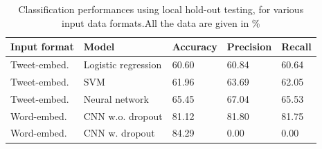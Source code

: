 \begin{table}[h]
  \centering
  \begin{tabular}[c]{lllll}
    Input format&Model&Accuracy&Precision&Recall\\
    \hline
    Tweet-embed.&Logistic regression & 60.60 &    60.84   & 60.64  \\
    Tweet-embed.&SVM             & 61.96    &   63.69     & 62.05   \\
    Tweet-embed.&Neural network & 65.45	& 67.04	& 65.53	 \\
    Word-embed.&CNN w.o. dropout &  81.12  & 81.80	& 81.75	 \\
    Word-embed.&CNN w. dropout & 84.29 & 0.00 & 0.00 
    
  \end{tabular}
  \caption{Classification performances using local hold-out testing, for various input data formats.All the data are given in \%}
  \label{tab:results}
\end{table}


